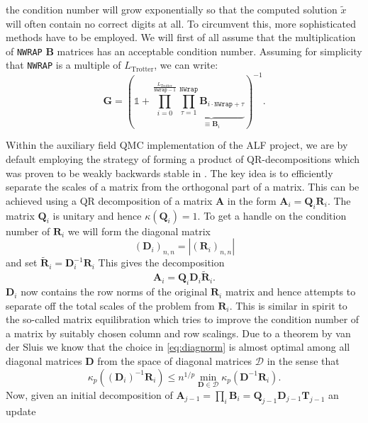 the condition number  will grow exponentially so that the computed solution $\tilde{x}$
will often contain no correct digits at all.
To circumvent this, more sophisticated methods have to be employed. We will first of all assume that the multiplication of \texttt{NWRAP} $\bm{B}$ matrices has an acceptable condition number.
Assuming for simplicity that \texttt{NWRAP} is a multiple of $L_{\text{Trotter}}$, we can write:
\begin{equation}
\bm{G} = \left( \mathds{1} + \prod\limits_{ i = 0}^{\frac{L_{\text{Trotter}}} {\texttt{NWrap} -1}}       \underbrace{\prod_{\tau=1}^{\texttt{NWrap}} \bm{B}_{i  \cdot  \texttt{NWrap}+ \tau} }_{ \equiv \mathcal{\bm{B}}_i}\right)^{-1}.
\end{equation}

Within the auxiliary field QMC implementation of the ALF project, we are by default employing
the strategy of forming a product of QR-decompositions which was proven to be weakly backwards stable in \cite{Bai2011}.
The key idea is to efficiently separate the scales of a matrix from the orthogonal part of a matrix.
This can be achieved using a QR decomposition of a matrix $\bm{A}$ in the form $\bm{A}_i = \bm{Q}_i \bm{R}_i$. The matrix $\bm{Q}_i$ is unitary and hence $\kappa(\bm{Q}_i) = 1$.
To get a handle on the condition number of $\bm{R}_i$ we will form the
diagonal matrix
\begin{equation}
(\bm{D}_i)_{n,n} = |(\bm{R}_i)_{n,n}|
\label{eq:diagnorm}
\end{equation}
and set $\tilde{\bm{R}}_i = \bm{D}_i^{-1} \bm{R}_i$
This gives the decomposition
\begin{equation}
\bm{A}_i = \bm{Q}_i \bm{D}_i \tilde{\bm{R}}_i.
\end{equation}
$\bm{D}_i$ now contains the row norms of the original $\bm{R}_i$ matrix and hence attempts to separate off the total scales of the problem from $\bm{R}_i$.
This is similar in spirit to the so-called matrix equilibration which tries to improve the condition number of a matrix by suitably chosen column and row scalings.
Due to a theorem by van der Sluis \cite{vanderSluis1969} we know that the choice in \eqref{eq:diagnorm} is almost optimal among all diagonal matrices $\bm{D}$ from the space of diagonal matrices 
$\mathcal{D}$ in the sense that
\begin{equation*}
\kappa_p((\bm{D}_i)^{-1} \bm{R}_i ) \leq n^{1/p} \min_{\bm{D} \in \mathcal{D}} \kappa_p(\bm{D}^{-1} \bm{R}_i).
\end{equation*}
Now, given an initial decomposition of $\bm{A}_{j-1} = \prod_i \mathcal{\bm{B}}_i = \bm{Q}_{j-1} \bm{D}_{j-1} \bm{T}_{j-1}$ an update
